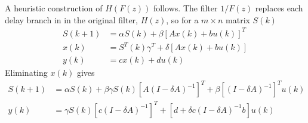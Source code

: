 \documentclass[a4paper,twoside,10pt,english]{report}
\begin{document}
A heuristic construction of $H\left(F\left(z\right)\right)$ follows.
The filter $1/F\left(z\right)$ replaces each delay branch in in the
original filter, $H\left(z\right)$, so for a $m\times n$ matrix
$S\left(k\right)$
\begin{align*}
S\left(k+1\right) &= \alpha S\left(k\right)+\beta\left[Ax\left(k\right)+bu\left(k\right)\right]^{T}\\
x\left(k\right) &= S^{T}\left(k\right)\gamma^{T}+\delta\left[Ax\left(k\right)+bu\left(k\right)\right]\\
y\left(k\right) &= cx\left(k\right)+du\left(k\right)
\end{align*}
Eliminating $x\left(k\right)$ gives
\begin{align*}
S\left(k+1\right) &= \alpha S\left(k\right)+\beta\gamma S\left(k\right)\left[A\left(I-\delta A\right)^{-1}\right]^{T}+\beta\left[\left(I-\delta A\right)^{-1}\right]^{T}u\left(k\right)\\
y\left(k\right) &= \gamma S\left(k\right)\left[c\left(I-\delta A\right)^{-1}\right]^{T}+\left[d+\delta c\left(I-\delta A\right)^{-1}b\right]u\left(k\right)
\end{align*}
\end{document}
